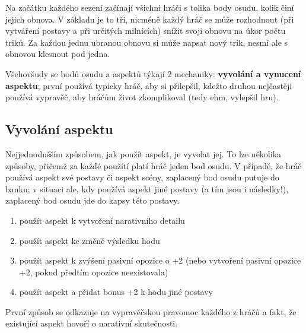 \documentclass[../main.tex]{subfiles}
\begin{document}
Na začátku každého sezení začínají všichni hráči s tolika body osudu, kolik činí jejich obnova. V základu je to tři, nicméně každý hráč se může rozhodnout (při vytváření postavy a při určitých milnících) snížit svoji obnovu na úkor počtu triků. Za každou jednu ubranou obnovu si může napsat nový trik, nesmí ale s obnovou klesnout pod jedna.

Všehovšudy se bodů osudu a aspektů týkají 2 mechaniky: \textbf{vyvolání a vynucení aspektu}; první používá typicky hráč, aby si přilepšil, kdežto druhou nejčastěji používá vypravěč, aby hráčům život zkomplikoval (tedy ehm, vylepšil hru).

\subsection{Vyvolání aspektu}
\label{sec:vyvolani-aspektu}

Nejjednodušším způsobem, jak použít aspekt, je vyvolat jej. To lze několika způsoby, přičemž za každé použítí platí hráč jeden bod osudu. V případě, že hráč používá aspekt své postavy či aspekt scény, zaplacený bod osudu putuje do banku; v situaci ale, kdy používá aspekt jiné postavy (a tím jsou i následky!), zaplacený bod osudu jde do kapsy této postavy.

\begin{Pravidlo}
\begin{enumerate}
\item použít aspekt k vytvoření narativního detailu
\item použít aspekt ke změně výsledku hodu
\item použít aspekt k zvýšení pasivní opozice o +2 (nebo vytvoření pasivní opozice +2, pokud předtím opozice neexistovala)
\item použít aspekt a přidat bonus +2 k hodu jiné postavy
\end{enumerate}
\end{Pravidlo}

První způsob se odkazuje na vypravěčskou pravomoc každého z hráčů a fakt, že existující aspekt hovoří o narativní skutečnosti. 
\end{document}
